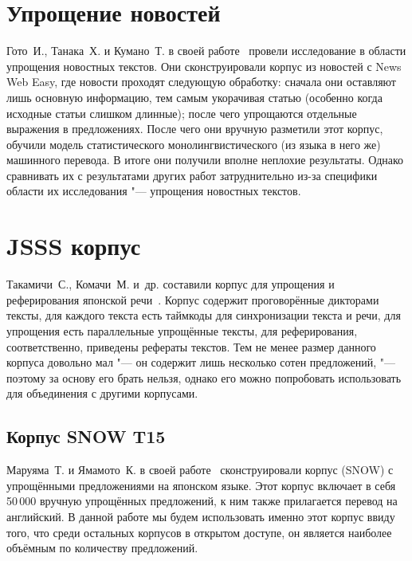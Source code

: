\section{Упрощение новостей}


Гото~И., Танака~Х. и Кумано~Т. в своей работе~\cite{newsSimplification} провели исследование в области упрощения новостных текстов.
Они сконструировали корпус из новостей с News Web Easy, где новости проходят следующую обработку: сначала они оставляют лишь основную информацию, тем самым укорачивая статью (особенно когда исходные статьи слишком длинные); после чего упрощаются отдельные выражения в предложениях. После чего они вручную разметили этот корпус, обучили модель статистического монолингвистического (из языка в него же) машинного перевода. В итоге они получили вполне неплохие результаты. Однако сравнивать их с результатами других работ затруднительно из-за специфики области их исследования "--- упрощения новостных текстов.


\section{JSSS корпус}


Такамичи~С., Комачи~М. и~др. составили корпус для упрощения и реферирования японской речи~\cite{takamichi2020jsss}.
Корпус содержит проговорённые дикторами тексты, для каждого текста есть таймкоды для синхронизации текста и речи, для упрощения есть параллельные упрощённые тексты, для реферирования, соответственно, приведены рефераты текстов.
Тем не менее размер данного корпуса довольно мал "--- он содержит лишь несколько сотен предложений, "--- поэтому за основу его брать нельзя, однако его можно попробовать использовать для объединения с другими корпусами.


\subsection{Корпус SNOW T15}


Маруяма~Т. и Ямамото~К. в своей работе~\cite{snow-dataset} сконструировали корпус (SNOW) с упрощёнными предложениями на японском языке.
Этот корпус включает в себя 50\,000 вручную упрощённых предложений, к ним также прилагается перевод на английский.
В данной работе мы будем использовать именно этот корпус ввиду того, что среди остальных корпусов в открытом доступе, он является наиболее объёмным по количеству предложений.


